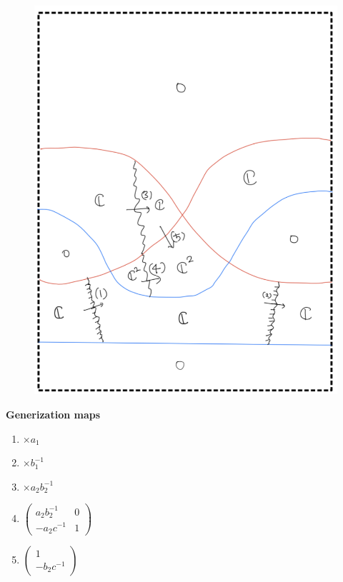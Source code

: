 \begin{enumerate}[label = (\roman*)]
\begin{enumerate}[label = (Step \arabic*)]
\begin{figure}[H]
    \includegraphics[scale = 0.95]{diagrams/cobord_gen/base_6.png}
    \caption{}
    \label{fig:your-label}
\end{figure}
\pagebreak
\textbf{Generization maps}
\begin{enumerate}[label = (\arabic*)]
\item $\times a_1$

\item $\times b_1^{-1}$

\item $\times a_2b_2^{-1}$

\item 
$\begin{pmatrix}
a_2b_2^{-1} & 0 \\
-a_2c^{-1} & 1
\end{pmatrix}$

\item 
$\begin{pmatrix}
1 \\
-b_2c^{-1} 
\end{pmatrix}$
\end{enumerate}


\end{enumerate}
\end{enumerate}
